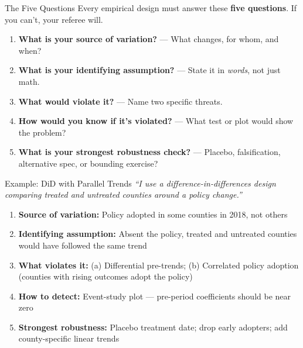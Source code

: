 \begin{frame}{The Five Questions}
  Every empirical design must answer these \textbf{five questions}. If you can't, your referee will.

  \vspace{4pt}

  \begin{enumerate}
    \item \textbf{What is your source of variation?} --- What changes, for whom, and when?
    \item \textbf{What is your identifying assumption?} --- State it in \textit{words}, not just math.
    \item \textbf{What would violate it?} --- Name two specific threats.
    \item \textbf{How would you know if it's violated?} --- What test or plot would show the problem?
    \item \textbf{What is your strongest robustness check?} --- Placebo, falsification, alternative spec, or bounding exercise?
  \end{enumerate}
\end{frame}

\begin{frame}{Example: DiD with Parallel Trends}
  \small
  \textit{``I use a difference-in-differences design comparing treated and untreated counties around a policy change.''}

  \vspace{8pt}

  \begin{enumerate}
    \item \textbf{Source of variation:} Policy adopted in some counties in 2018, not others
    \item \textbf{Identifying assumption:} Absent the policy, treated and untreated counties would have followed the same trend
    \item \textbf{What violates it:} (a) Differential pre-trends; (b) Correlated policy adoption (counties with rising outcomes adopt the policy)
    \item \textbf{How to detect:} Event-study plot --- pre-period coefficients should be near zero
    \item \textbf{Strongest robustness:} Placebo treatment date; drop early adopters; add county-specific linear trends
  \end{enumerate}
\end{frame}

